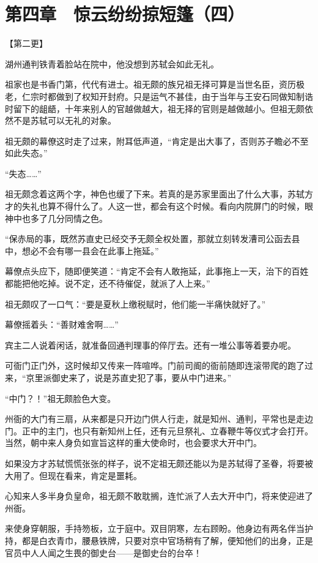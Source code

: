 \section{第四章　惊云纷纷掠短篷（四）}

【第二更】

湖州通判铁青着脸站在院中，他没想到苏轼会如此无礼。

祖家也是书香门第，代代有进士。祖无颇的族兄祖无择可算是当世名臣，资历极老，仁宗时都做到了权知开封府。只是运气不甚佳，由于当年与王安石同做知制诰时留下的龃龉，十年来别人的官越做越大，祖无择的官则是越做越小。但祖无颇依然不是苏轼可以无礼的对象。

祖无颇的幕僚这时走了过来，附耳低声道，“肯定是出大事了，否则苏子瞻必不至如此失态。”

“失态……”

祖无颇念着这两个字，神色也缓了下来。若真的是苏家里面出了什么大事，苏轼方才的失礼也算不得什么了。人这一世，都会有这个时候。看向内院屏门的时候，眼神中也多了几分同情之色。

“保赤局的事，既然苏直史已经交予无颇全权处置，那就立刻转发漕司公函去县中，想必不会有哪一县会在此事上拖延。”

幕僚点头应下，随即便笑道：“肯定不会有人敢拖延，此事拖上一天，治下的百姓都能把他吃掉。说不定，还不待催促，就派了人上来。”

祖无颇叹了一口气：“要是夏秋上缴税赋时，他们能一半痛快就好了。”

幕僚摇着头：“善财难舍啊……”

宾主二人说着闲话，就准备回通判理事的倅厅去。还有一堆公事等着要办呢。

可衙门正门外，这时候却又传来一阵喧哗。门前司阍的衙前随即连滚带爬的跑了过来，“京里派御史来了，说是苏直史犯了事，要从中门进来。”

“中门？！”祖无颇脸色大变。

州衙的大门有三扇，从来都是只开边门供人行走，就是知州、通判，平常也是走边门。正中的主门，也只有新知州上任，还有元旦祭礼、立春鞭牛等仪式才会打开。当然，朝中来人身负如宣旨这样的重大使命时，也会要求大开中门。

如果没方才苏轼慌慌张张的样子，说不定祖无颇还能以为是苏轼得了圣眷，将要被大用了。但现在看来，肯定是噩耗。

心知来人多半身负皇命，祖无颇不敢耽搁，连忙派了人去大开中门，将来使迎进了州衙。

来使身穿朝服，手持笏板，立于庭中。双目阴寒，左右顾盼。他身边有两名伴当护持，都是白衣青巾，腰悬铁牌，只要对京中官场稍有了解，便知他们的出身，正是官员中人人闻之生畏的御史台——是御史台的台卒！

